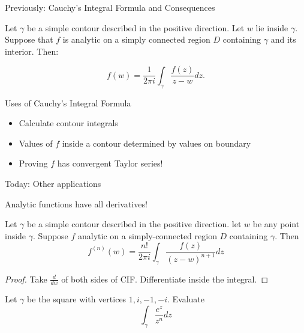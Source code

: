 \documentclass{beamer}
\begin{document}
\begin{frame}{Previously: Cauchy's Integral Formula and Consequences}
\begin{theorem} Let $\gamma$ be a simple contour described in the positive direction.  Let $w$ lie inside $\gamma$.  Suppose that $f$ is analytic on a simply connected region $D$ containing $\gamma$ and its interior.  Then:

$$f(w)=\frac{1}{2\pi i} \int_\gamma\frac{f(z)}{z-w}dz.$$

\end{theorem}
\begin{block}{Uses of Cauchy's Integral Formula}
\begin{itemize}
    \item Calculate contour integrals
    \item Values of $f$ inside a contour determined by values on boundary
    \item \alert{Proving $f$ has convergent Taylor series!}
\end{itemize}
\end{block}
\begin{block}{Today: Other applications}
\end{block}

\end{frame}


\begin{frame}{Analytic functions have all derivatives!}
\begin{theorem}
Let $\gamma$ be a simple contour described in the positive direction.  let $w$ be any point inside $\gamma$.  Suppose $f$ analytic on a simply-connected region $D$ containing $\gamma$.
Then $$f^{(n)}(w)=\frac{n!}{2\pi i}\int_\gamma \frac{f(z)}{(z-w)^{n+1}}dz$$

\end{theorem}

\begin{proof}Take $\frac{d}{dw}$ of both sides of CIF.  Differentiate inside the integral.
\end{proof}
\begin{example} Let $\gamma$ be the square with vertices $1, i, -1,-i$.  Evaluate
$$\int_\gamma\frac{e^z}{z^n}dz$$

\end{example}
\end{frame}
\end{document}
